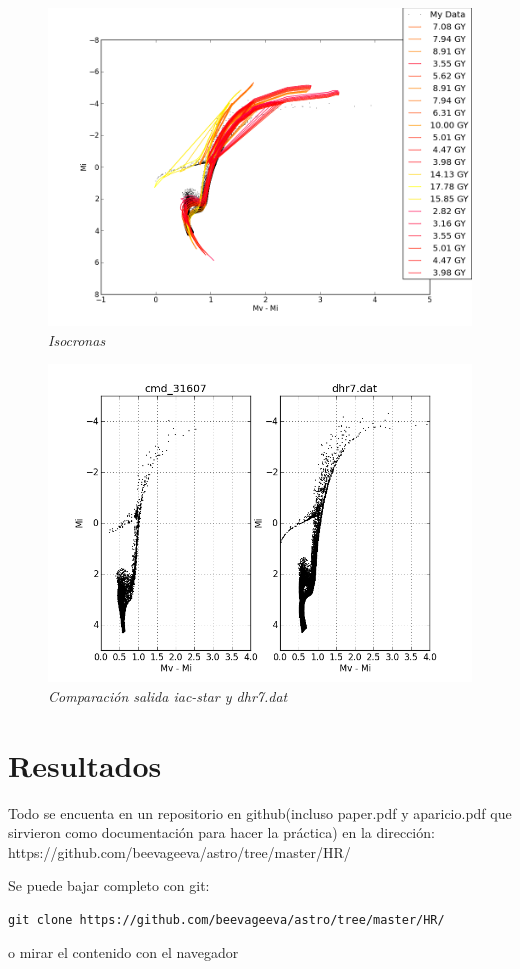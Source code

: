 \documentclass[10pt]{book}
\begin{document}
\begin{itemize}
\begin{figure}[!h]
 \centering
 \includegraphics[scale=0.7]{alllines.png}
 \caption{\emph{Isocronas}}
 \label{Fig: 1}
\end{figure}

\begin{figure}[!h]
 \centering
 \includegraphics[scale=0.7]{cmd_31607.png}
 \caption{\emph{Comparación salida iac-star y  dhr7.dat}}
 \label{Fig: 2}
\end{figure}
\end{itemize}






\section*{Resultados}
Todo se encuenta en un repositorio en github(incluso paper.pdf y aparicio.pdf que sirvieron como documentación para hacer la práctica) en la dirección: https://github.com/beevageeva/astro/tree/master/HR/

Se puede bajar completo con git:
\begin{verbatim}
git clone https://github.com/beevageeva/astro/tree/master/HR/  
\end{verbatim}
o mirar el contenido con el navegador








 
\end{document}
